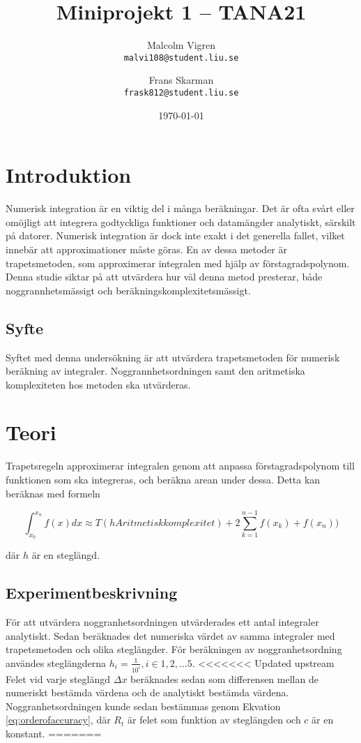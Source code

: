 \documentclass[a4paper,titlepage]{article}
\title{
    \textbf{Miniprojekt 1 -- TANA21}}
\date{\today}
\author{%
    Malcolm Vigren \\
    \texttt{malvi108@student.liu.se}
    \and
    Frans Skarman\\
    \texttt{frask812@student.liu.se}
    }
\begin{document}
\maketitle
\newpage
\tableofcontents
\newpage

\section{Introduktion}
Numerisk integration är en viktig del i många beräkningar. Det är ofta svårt
eller omöjligt att integrera godtyckliga funktioner och datamängder analytiskt,
särskilt på datorer. Numerisk integration är dock inte exakt i det generella
fallet, vilket innebär att approximationer måste göras. En av dessa metoder
är trapetsmetoden, som approximerar integralen med hjälp av förstagradspolynom.
Denna studie siktar på att utvärdera hur väl denna metod presterar,
både noggrannhetsmässigt och beräkningskomplexitetsmässigt.

\subsection{Syfte}
Syftet med denna undersökning är att utvärdera trapetsmetoden för numerisk
beräkning av integraler. Noggrannhetsordningen samt den aritmetiska
komplexiteten hos metoden ska utvärderas.

\section{Teori}
Trapetsregeln approximerar integralen genom att anpassa förstagradspolynom till
funktionen som ska integreras, och beräkna arean under dessa. Detta kan
beräknas med formeln

\begin{equation}
    \int_{x_0}^{x_n}f(x)dx \approx T(hAritmetisk komplexitet) +
    2\sum_{k=1}^{n-1}f(x_k) + f(x_n))
\end{equation}

där $h$ är en steglängd.

\subsection{Experimentbeskrivning}

För att utvärdera noggranhetsordningen utvärderades ett antal integraler
analytiskt. Sedan beräknades det numeriska värdet av samma integraler med
trapetsmetoden och olika steglängder. För beräkningen av noggranhetsordning
användes steglängderna $h_i = \frac{1}{10^i}, i \in {1,2, \dots 5}$.
<<<<<<< Updated upstream
Felet vid varje steglängd $\Delta x$ beräknades sedan som differensen mellan de numeriskt
bestämda värdena och de analytiskt bestämda värdena.  Noggranhetsordningen
kunde sedan bestämmas genom Ekvation \ref{eq:orderofaccuracy}, där $R_t$
är felet som funktion av steglängden och $c$ är en konstant.
=======
\end{document}
